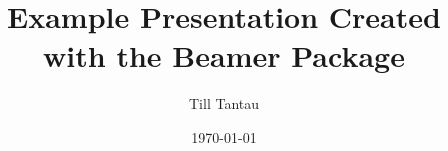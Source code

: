 
\newcommand{\aim}{MP1 recap/MP2 preview} 
\newcommand{\class}{Python }
\newcommand{\num}{ 2.2}
\newcommand{\reminders}{

\begin{enumerate}
	\item Weekly CodeHS expectations  up on Google Classroom
	\item  Only two marking periods this semester! 2nd marking period ends \textbf{late January}.
	\item \textbf{Daily Office Hours:} 2:36-3:06 (via Google Meet; see Google Classroom!)
	\item Assessment \#2 up on CodeHS!
\end{enumerate}
}
\documentclass{beamer}


\title{Example Presentation Created with the Beamer Package}
\author{Till Tantau}
\date{\today}



\frame{\titlepage}

\section[Outline]{}
\frame{\tableofcontents}

\section{Introduction}
\subsection{Overview of the Beamer Class}
\frame
{
  \frametitle{Features of the Beamer Class}

  \begin{itemize}
  \item<1-> Normal LaTeX class.
  \item<2-> Easy overlays.
  \item<3-> No external programs needed.      
  \end{itemize}
}



\documentclass[t,aspectratio=169,usenames,dvipsnames]{beamer}

\usepackage{listings}

\usepackage{pgfpages}


